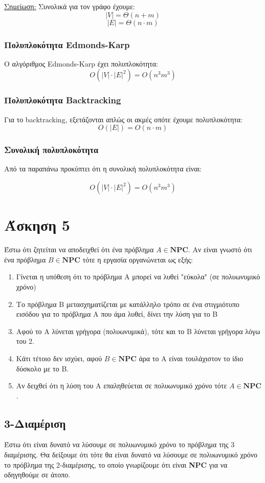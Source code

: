 \documentclass[a4paper,oneside, 11pt]{article}
\begin{document}
\underline{Σημείωση:} Συνολικά για τον γράφο έχουμε:
$$
|V| = \Theta(n+m) 
$$
$$
|E| = \Theta(n \cdot m)
$$

\subsubsection{Πολυπλοκότητα Edmonds-Karp}
Ο αλγόριθμος Edmonds-Karp έχει πολυπλοκότητα:
$$
O(|V|\cdot |E|^2) = O(n^3m^3)
$$
\subsubsection{Πολυπλοκότητα Backtracking}
Για το backtracking, εξετάζονται απλώς οι ακμές οπότε έχουμε πολυπλοκότητα: $$O(|E|) = O(n\cdot m)$$


\subsubsection{Συνολική πολυπλοκότητα}
Από τα παραπάνω προκύπτει ότι η συνολική πολυπλοκότητα είναι:

$$
O(|V|\cdot |E|^2) = O(n^3m^3)
$$

\section{Άσκηση 5}
Έστω ότι ζητείται να αποδειχθεί ότι ένα πρόβλημα $A \in \mathbf{NPC}$. Αν είναι γνωστό ότι ένα πρόβλημα $B \in \mathbf{NPC}$ τότε η εργασία οργανώνεται ως εξής:
\begin{enumerate}
	\item Γίνεται η υπόθεση ότι το πρόβλημα Α μπορεί να λυθεί "εύκολα" (σε πολυωνυμικό χρόνο)
	\item Το πρόβλημα Β μετασχηματίζεται με κατάλληλο τρόπο σε ένα στιγμιότυπο εισόδου για το πρόβλημα Α που άμα λυθεί, δίνει την λύση για το Β
	\item Αφού το Α λύνεται γρήγορα (πολυωνυμικά), τότε και το Β λύνεται γρήγορα λόγω του 2.
	\item Κάτι τέτοιο δεν ισχύει, αφού $B \in \mathbf{NPC}$ άρα το Α είναι τουλάχιστον το ίδιο δύσκολο με το B.
	\item Αν δειχθεί ότι η λύση του Α επαληθεύεται σε πολυωνυμικό χρόνο τότε $A \in \mathbf{NPC}$.
\end{enumerate}

\subsection{3-Διαμέριση}
Έστω ότι είναι δυνατό να λύσουμε σε πολυωνυμικό χρόνο το πρόβλημα της 3 διαμέρισης. Θα δείξουμε ότι τότε θα είναι δυνατό να λύσουμε σε πολυωνυμικό χρόνο το πρόβλημα της 2-διαμέρισης, το οποίο γνωρίζουμε ότι είναι \textbf{NPC} για να οδηγηθούμε σε άτοπο. \bigbreak 
\end{document}
